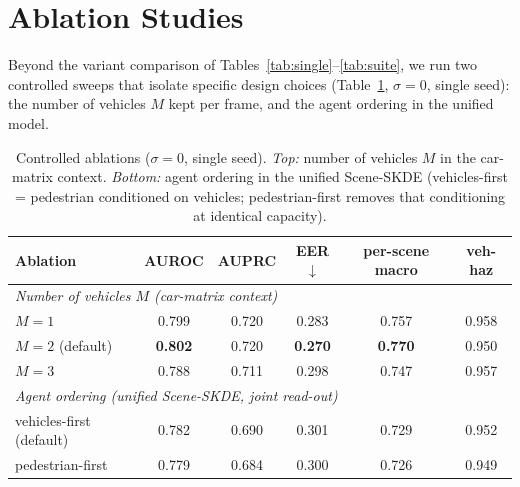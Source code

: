 \documentclass{article}
\begin{document}
\section{Ablation Studies}
\label{sec:ablation}
Beyond the variant comparison of Tables~\ref{tab:single}--\ref{tab:suite}, we run
two controlled sweeps that isolate specific design choices (Table~\ref{tab:abl},
$\sigma{=}0$, single seed): the number of vehicles $M$ kept per frame, and the
agent ordering in the unified model.

\begin{table}[t]
\centering
\caption{Controlled ablations ($\sigma{=}0$, single seed). \emph{Top:} number of
vehicles $M$ in the car-matrix context. \emph{Bottom:} agent ordering in the
unified Scene-SKDE (vehicles-first = pedestrian conditioned on vehicles;
pedestrian-first removes that conditioning at identical capacity).}
\label{tab:abl}
\begin{tabular}{lccccc}
\toprule
Ablation & AUROC & AUPRC & EER$\downarrow$ & per-scene macro & veh-haz \\
\midrule
\multicolumn{6}{l}{\emph{Number of vehicles $M$ (car-matrix context)}}\\
\;\;$M{=}1$ & 0.799 & 0.720 & 0.283 & 0.757 & 0.958 \\
\;\;$M{=}2$ (default) & \textbf{0.802} & 0.720 & \textbf{0.270} & \textbf{0.770} & 0.950 \\
\;\;$M{=}3$ & 0.788 & 0.711 & 0.298 & 0.747 & 0.957 \\
\midrule
\multicolumn{6}{l}{\emph{Agent ordering (unified Scene-SKDE, joint read-out)}}\\
\;\;vehicles-first (default) & 0.782 & 0.690 & 0.301 & 0.729 & 0.952 \\
\;\;pedestrian-first & 0.779 & 0.684 & 0.300 & 0.726 & 0.949 \\
\bottomrule
\end{tabular}
\end{table}
\end{document}
